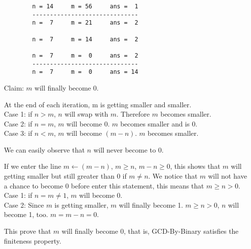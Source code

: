 \documentclass[11pt]{homework}
\begin{document}
  \begin{arabicpartsdsa}
    \item 

        \begin{verbatim}
        n = 14     m = 56     ans =  1
        ------------------------------
        n =  7     m = 21     ans =  2

        n =  7     m = 14     ans =  2

        n =  7     m =  0     ans =  2
        ------------------------------
        n =  7     m =  0     ans = 14 
        \end{verbatim}

    \item 

        Claim: \(m\) will finally become 0.
        \begin{arabicpartsdsasec}
        \item
            At the end of each iteration, m is getting smaller and smaller.  \\
            Case 1: if \(n > m\), \(n\) will swap with \(m\). Therefore \(m\) becomes smaller.   \\
            Case 2: if \(n = m\), \(m\) will become 0. \(m\) becomes smaller and is 0.  \\
            Case 3: if \(n < m\), \(m\) will become \((m-n)\). \(m\) becomes smaller. 
        \item
            We can easily observe that \(n\) will never become to 0.
        \item
            If we enter the line \(m \leftarrow (m - n)\), \(m \geq n\), \(m - n \geq 0\), this shows that \(m\) will getting
            smaller but still greater than 0 if \(m \neq n\). We notice that \(m\) will not have a chance to become 0
            before enter this statement, this means that \(m \geq n > 0\).\\
            Case 1: if \(n = m \neq 1\), \(m\) will become 0.  \\
            Case 2: Since \(m\) is getting smaller, \(m\) will finally become 1. \(m \geq n >0\), \(n\) will become 1, too. \(m = m - n = 0\).

        \end{arabicpartsdsasec}
        This prove that \(m\) will finally become 0, that is, GCD-By-Binary satisfies the finiteness
        property.

    \item


\end{arabicpartsdsa}
\end{document}
